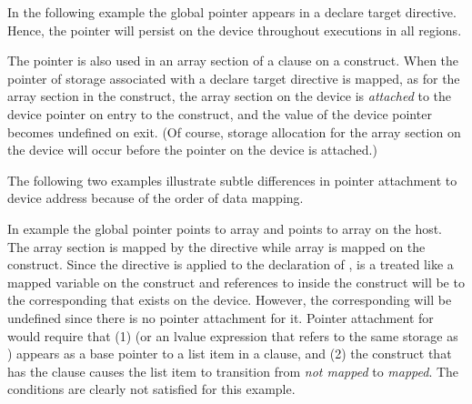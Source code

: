 

In the following example the global pointer  appears in a
declare target directive.  Hence, the pointer  will 
persist on the device throughout executions in all  regions.

The pointer is also used in an array section of a  clause on 
a  construct.  When the pointer of storage associated with 
a declare target directive
is mapped, as for the array section  in the
 construct, the array section on the device is \emph{attached}
to the device pointer  on entry to the construct, and
the value of the device pointer  becomes undefined on exit. 
(Of course, storage allocation for
the array section on the device will occur before the 
pointer on the device is attached.)



The following two examples illustrate subtle differences in pointer attachment
to device address because of the order of data mapping.

In example  
the global pointer  points to array  and  points to
array  on the host.
The array section  is mapped by the  directive while array  is mapped
on the  construct. 
Since the  directive is applied to the declaration
of ,  is a treated like a mapped variable on the 
construct and references to  inside the construct will be to the
corresponding  that exists on the device.  However, the corresponding
 will be undefined since there is no pointer attachment for it. Pointer
attachment for  would require that (1)  (or an lvalue
expression that refers to the same storage as ) appears as a base
pointer to a list item in a  clause, and (2) the construct that has
the  clause causes the list item to transition from \emph{not mapped}
to \emph{mapped}. The conditions are clearly not satisfied for this example.

